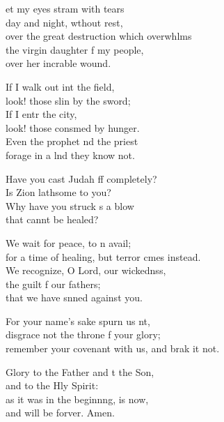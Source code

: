 \begin{psalmverse}
  \begin{patverse}
et my eyes stram with tears\Med\\
day and night, w\pointup{\i}thout rest,\\
over the great destruction which overwhlms\Flex\\
the virgin daughter f my people,\Med\\
over her incrable wound.

If I walk out int the field,\Med\\
look! those slin by the sword;\\
If I entr the city,\Med\\
look! those consmed by hunger.\\
Even the prophet nd the priest\Med\\
forage in a lnd they know not.

Have you cast Judah ff completely?\Med\\
Is Zion lathsome to you?\\
Why have you struck s a blow\Med\\
that cannt be healed?

We wait for peace, to n avail;\Med\\
for a time of healing, but terror cmes instead.\\
We recognize, O Lord, our wickednss,\Flex\\
the guilt f our fathers;\Med\\
that we have s\pointup{\i}nned against you.

For your name’s sake spurn us nt,\Flex\\
disgrace not the throne f your glory;\Med\\
remember your covenant with us, and brak it not.

Glory to the Father and t the Son,\Med\\
and to the Hly Spirit:\\
as it was in the beginn\pointup{\i}ng, is now,\Med\\
and will be forver. Amen.
  \end{patverse}
\end{psalmverse}
